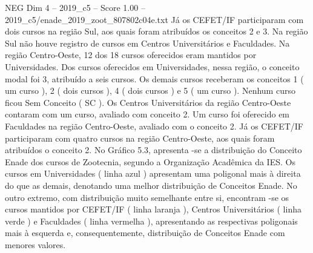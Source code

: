 \begin{textsample}{NEG Dim 4 – 2019\_c5 – Score 1.00 – 2019\_c5/enade\_2019\_zoot\_807802c04e.txt}
Já os CEFET/IF participaram com dois cursos na região Sul, aos quais foram atribuídos os conceitos 2 e 3.
Na região Sul não houve registro de cursos em Centros Universitários e Faculdades.
Na região Centro-Oeste, 12 dos 18 cursos oferecidos eram mantidos por Universidades.
Dos cursos oferecidos em Universidades, nessa região, o conceito modal foi 3, atribuído a seis cursos.
Os demais cursos receberam os conceitos 1 ( um curso ), 2 ( dois cursos ), 4 ( dois cursos ) e 5 ( um curso ).
Nenhum curso ficou Sem Conceito ( SC ).
Os Centros Universitários da região Centro-Oeste contaram com um curso, avaliado com conceito 2.
Um curso foi oferecido em Faculdades na região Centro-Oeste, avaliado com o conceito 2.
Já os CEFET/IF participaram com quatro cursos na região Centro-Oeste, aos quais foram atribuídos o conceito 2.
No Gráfico 5.3, apresenta -se a distribuição do Conceito Enade dos cursos de Zootecnia, segundo a Organização Acadêmica da IES.
Os cursos em Universidades ( linha azul ) apresentam uma poligonal mais à direita do que as demais, denotando uma melhor distribuição de Conceitos Enade.
No outro extremo, com distribuição muito semelhante entre si, encontram -se os cursos mantidos por CEFET/IF ( linha laranja ), Centros Universitários ( linha verde ) e Faculdades ( linha vermelha ), apresentando as respectivas poligonais mais à esquerda e, consequentemente, distribuição de Conceitos Enade com menores valores.

\end{textsample}
